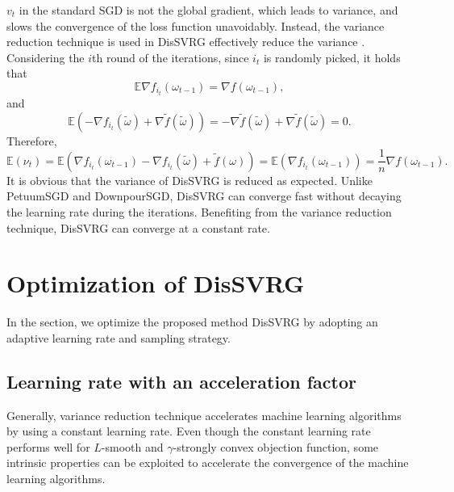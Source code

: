 \documentclass[preprint,review,11pt,a4paper]{elsarticle}
\begin{document}
$v_t$ in the standard SGD is not the global gradient, which leads to variance, and slows the convergence of the loss function unavoidably. Instead, the variance reduction technique is used in DisSVRG effectively reduce the variance \cite{Johnson:9MAvkbgy}. Considering the $i$th round of the iterations, since $i_t$ is randomly picked, it holds that
\begin{equation}
\mathbb{E}\nabla f_{i_t}(\omega_{t-1})=\nabla f(\omega_{t-1}),
\end{equation}
and
\begin{equation}
\mathbb{E}(-\nabla f_{i_t}(\tilde{\omega})+ \nabla \tilde{f}(\tilde{\omega}))= - \nabla \tilde{f}(\tilde{\omega})+\nabla \tilde{f}(\tilde{\omega})=0.
\end{equation}
Therefore,
\begin{equation}
\mathbb{E}( \nu_t )= \mathbb{E}(\nabla f_{i_t}(\omega_{t-1})-\nabla f_{i_t}(\tilde{\omega})+\tilde{f}(\omega))=\mathbb{E}(\nabla f_{i_t}(\omega_{t-1}))=\frac{1}{n}\nabla f(\omega_{t-1}).
\end{equation}
It is obvious that the variance of DisSVRG is reduced as expected. Unlike PetuumSGD and DownpourSGD, DisSVRG can converge fast without decaying the learning rate during the iterations. Benefiting from the variance reduction technique, DisSVRG  can converge at a constant rate.

\section{Optimization of DisSVRG}
\label{optimization_sgd}
In the section, we optimize the proposed method DisSVRG by adopting an adaptive learning rate and sampling strategy.

\subsection{Learning rate with an acceleration factor}
Generally, variance reduction technique accelerates machine learning algorithms by using a constant learning rate. Even though the constant learning rate performs well for $L$-smooth and $\gamma$-strongly convex objection function, some intrinsic properties can be exploited to accelerate the convergence of the machine learning algorithms.
\end{document}
